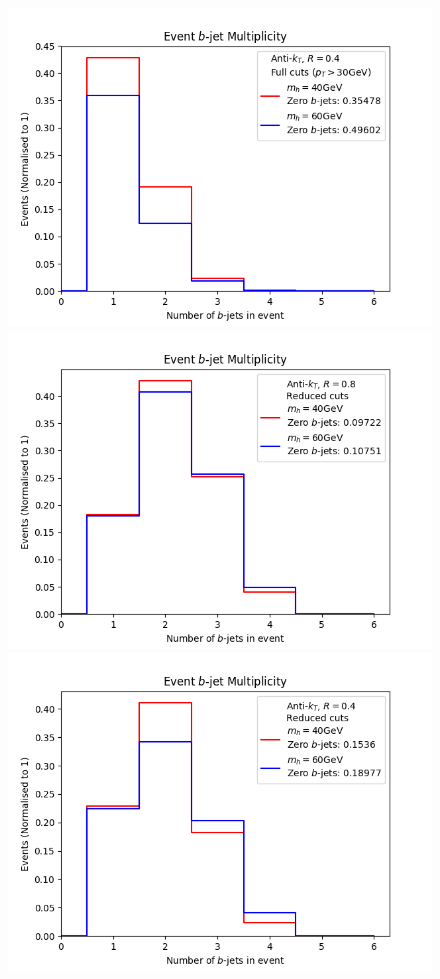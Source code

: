 \begin{figure}[t!]
	\includegraphics[scale=0.5]{plots/nbjets_AK4_pt30.png}
	\includegraphics[scale=0.5]{plots/nbjets_AK8_lowptcut.png}
	\includegraphics[scale=0.5]{plots/nbjets_AK4_lowptcut.png}\\

\end{figure}
